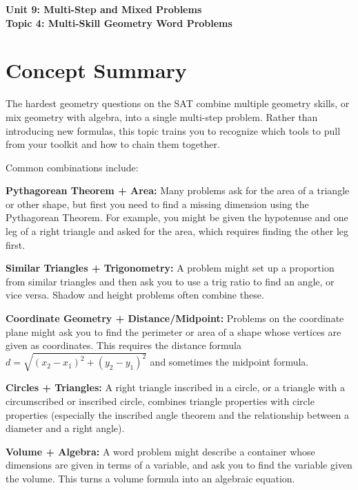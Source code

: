 \documentclass[14pt]{extarticle}
\begin{document}
\raggedright
{}

\begin{center}
    \LARGE \textbf{Unit 9: Multi-Step and Mixed Problems} \\[6pt]
    \Large \textbf{Topic 4: Multi-Skill Geometry Word Problems}
\end{center}

\vspace{1em}

\section*{Concept Summary}

The hardest geometry questions on the SAT combine multiple geometry skills, or mix geometry with algebra, into a single multi-step problem. Rather than introducing new formulas, this topic trains you to recognize which tools to pull from your toolkit and how to chain them together.

Common combinations include:

\textbf{Pythagorean Theorem + Area:} Many problems ask for the area of a triangle or other shape, but first you need to find a missing dimension using the Pythagorean Theorem. For example, you might be given the hypotenuse and one leg of a right triangle and asked for the area, which requires finding the other leg first.

\textbf{Similar Triangles + Trigonometry:} A problem might set up a proportion from similar triangles and then ask you to use a trig ratio to find an angle, or vice versa. Shadow and height problems often combine these.

\textbf{Coordinate Geometry + Distance/Midpoint:} Problems on the coordinate plane might ask you to find the perimeter or area of a shape whose vertices are given as coordinates. This requires the distance formula \(d = \sqrt{(x_2 - x_1)^2 + (y_2 - y_1)^2}\) and sometimes the midpoint formula.

\textbf{Circles + Triangles:} A right triangle inscribed in a circle, or a triangle with a circumscribed or inscribed circle, combines triangle properties with circle properties (especially the inscribed angle theorem and the relationship between a diameter and a right angle).

\textbf{Volume + Algebra:} A word problem might describe a container whose dimensions are given in terms of a variable, and ask you to find the variable given the volume. This turns a volume formula into an algebraic equation.
\end{document}
